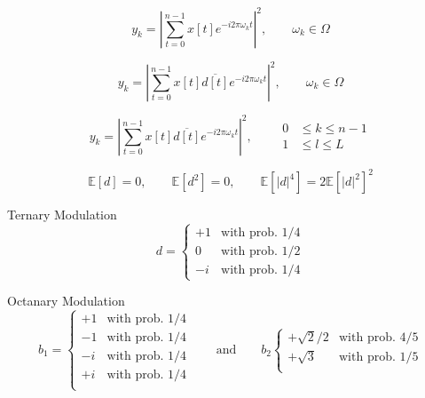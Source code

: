 			




\begin{equation*}
	y_k = \left| \sum_{t=0}^{n-1} x[t] e^{-i2\pi\omega_kt} \right|^2 , \qquad \omega_k \in \Omega
  \end{equation*}
  
  \begin{equation*}
	y_k = \left| \sum_{t=0}^{n-1} x[t]\overline{d[t]} e^{-i2\pi\omega_kt} \right|^2 , \qquad \omega_k \in \Omega
  \end{equation*}
  
  \begin{equation*}
	y_k = \left| \sum_{t=0}^{n-1} x[t]\overline{d[t]} e^{-i2\pi\omega_kt} \right|^2 , \qquad \begin{split}
	0 &\leq k \leq n-1\\
	1 &\leq l \leq L
	\end{split}
  \end{equation*}
  
  \begin{equation*}
	\mathbb{E}\left[d\right] = 0, \qquad \mathbb{E}\left[d^2\right] = 0, \qquad\mathbb{E}\left[\left|d\right|^4\right] = 2\mathbb{E}\left[\left|d\right|^2\right]^2
  \end{equation*}
  
  Ternary Modulation
  \begin{equation*}
	d =
		\begin{cases}
			+1 & \text{with prob.  $1/4$}\\
			0 & \text{with prob.  $1/2$}\\
			-i & \text{with prob.  $1/4$}
		\end{cases}  
  \end{equation*}
  
  
  
  
  
  Octanary Modulation
  \begin{equation*}
	b_1 =
		\begin{cases}
			+1 & \text{with prob.  $1/4$}\\
			-1 & \text{with prob.  $1/4$}\\
			-i & \text{with prob.  $1/4$}\\
			+i & \text{with prob.  $1/4$}\\
  
		\end{cases}  
		\qquad \text{and} \qquad 
	b_2 
		\begin{cases}  
		  +\sqrt{2}/2 & \text{with prob.  $4/5$}\\
		  +\sqrt{3} & \text{with prob.  $1/5$}\\
	  \end{cases}   
  \end{equation*}



